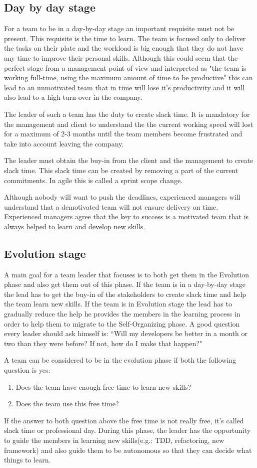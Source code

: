 \subsection{Day by day stage}
For a team to be in a day-by-day stage an important requisite must not be present. This requisite is the time to learn. The team is focused only to deliver the tasks on their plate and the workload is big enough that they do not have any time to improve their personal skills. Although this could seem that the perfect stage from a management point of view and interpreted as "the team is working full-time, using the maximum amount of time to be productive" this can lead to an unmotivated team that in time will lose it's productivity and it will also lead to a high turn-over in the company. 

The leader of such a team has the duty to create slack time. It is mandatory for the management and client to understand the the current working speed will lost for a maximum of 2-3 months until the team members become frustrated and take into account leaving the company.

The leader must obtain the buy-in from the client and the management to create slack time. This slack time can be created by removing a part of the current commitments. In agile this is called a sprint scope change.

Although nobody will want to push the deadlines, experienced managers will understand that a demotivated team will not ensure delivery on time. Experienced managers agree that the key to success is a motivated team that is always helped to learn and develop new skills.

\subsection{Evolution stage}
A main goal for a team leader that focuses is to both get them in the Evolution phase and also get them out of this phase. If the team is in a day-by-day stage the lead has to get the buy-in of the stakeholders to create slack time and help the team learn new skills. If the team is in Evolution stage the lead has to gradually reduce the help he provides the members in the learning process in order to help them to migrate to the Self-Organizing phase. A good question every leader should ask himself is: ``Will my developers be better in a month or two than they were before? If not, how do I make that happen?"\cite{notes-to-a-software-team-leader}

A team can be considered to be in the evolution phase if both the following question is yes:
\begin{enumerate}
\item Does the team have enough free time to learn new skills?
\item Does the team use this free time?
\end{enumerate}
If the answer to both question above the free time is not really free, it's called slack time or professional day. 
During this phase, the leader has the opportunity to guide the members in learning new skills(e.g.: TDD, refactoring, new framework) and also 
guide them to be autonomous so that they can decide what things to learn.

